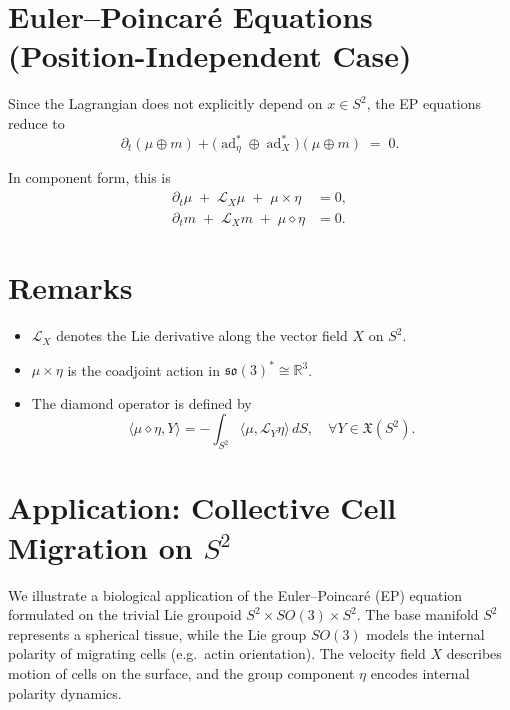\documentclass{article}
\begin{document}
\section*{Euler--Poincar\'e Equations (Position-Independent Case)}
Since the Lagrangian does not explicitly depend on $x \in S^2$, the EP equations reduce to
\begin{equation}
\partial_t(\mu \oplus m)
+ \big( \operatorname{ad}^*_\eta \oplus \operatorname{ad}^*_X \big)(\mu \oplus m) \;=\; 0.
\end{equation}

In component form, this is
\begin{align}
\partial_t \mu \;+\; \mathcal{L}_X \mu \;+\; \mu \times \eta &= 0, \\[6pt]
\partial_t m \;+\; \mathcal{L}_X m \;+\; \mu \diamond \eta &= 0.
\end{align}

\section*{Remarks}
\begin{itemize}
  \item $\mathcal L_X$ denotes the Lie derivative along the vector field $X$ on $S^2$.
  \item $\mu \times \eta$ is the coadjoint action in $\mathfrak{so}(3)^* \cong \mathbb R^3$.
  \item The diamond operator is defined by
  \[
  \langle \mu \diamond \eta, Y \rangle = -\int_{S^2} \langle \mu, \mathcal L_Y \eta \rangle\, dS,
  \quad \forall Y \in \mathfrak X(S^2).
  \]
\end{itemize}

\section{Application: Collective Cell Migration on $S^2$}

We illustrate a biological application of the Euler--Poincar\'e (EP) equation formulated on the trivial Lie groupoid $S^2 \times SO(3) \times S^2$. The base manifold $S^2$ represents a spherical tissue, while the Lie group $SO(3)$ models the internal polarity of migrating cells (e.g.\ actin orientation). The velocity field $X$ describes motion of cells on the surface, and the group component $\eta$ encodes internal polarity dynamics.
\end{document}
